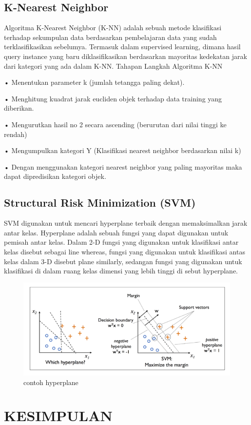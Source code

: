 \documentclass[conference]{IEEEtran}
\begin{document}
\subsection{K-Nearest Neighbor}
Algoritma K-Nearest Neighbor (K-NN) adalah sebuah
metode klasifikasi terhadap sekumpulan data berdasarkan
pembelajaran data yang sudah terklasifikasikan sebelumya.
Termasuk dalam supervised learning, dimana hasil query
instance yang baru diklasifikasikan berdasarkan mayoritas
kedekatan jarak dari kategori yang ada dalam K-NN.
Tahapan Langkah Algoritma K-NN

• Menentukan parameter k (jumlah tetangga paling dekat).

• Menghitung kuadrat jarak eucliden objek terhadap data
training yang diberikan.

• Mengurutkan hasil no 2 secara ascending (berurutan dari
nilai tinggi ke rendah)

• Mengumpulkan kategori Y (Klasifikasi nearest neighbor
berdasarkan nilai k)

• Dengan menggunakan kategori nearest neighbor yang
paling mayoritas maka dapat dipredisikan kategori objek.

\subsection{Structural Risk Minimization (SVM)}
SVM digunakan untuk mencari hyperplane terbaik dengan
memaksimalkan jarak antar kelas. Hyperplane adalah sebuah
fungsi yang dapat digunakan untuk pemisah antar kelas.
Dalam 2-D fungsi yang digunakan untuk klasifikasi antar
kelas disebut sebagai line whereas, fungsi yang digunakan
untuk klasifikasi antas kelas dalam 3-D disebut plane similarly,
sedangan fungsi yang digunakan untuk klasifikasi di dalam
ruang kelas dimensi yang lebih tinggi di sebut hyperplane.

\begin{figure}
\centering
\includegraphics[width=.4\textwidth]{Gambar/gambar8.png}
\caption{contoh hyperplane}
\end{figure}


\section*{KESIMPULAN}
\end{document}
